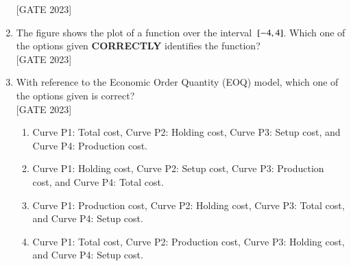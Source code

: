 \documentclass[journal,12pt,onecolumn]{IEEEtran}
\theoremstyle{remark}
\begin{document}
\begin{enumerate}
\hfill{[GATE 2023]}\begin{enumerate}
\end{enumerate}

\item The figure shows the plot of a function over the interval ${}\left[-4, 4\right]$. Which one of the options given \textbf{CORRECTLY} identifies the function?\\



\hfill{[GATE 2023]}\begin{enumerate}
\end{enumerate}
\item With reference to the Economic Order Quantity (EOQ) model, which one of the options given is correct?\\ 




\hfill{[GATE 2023]}\begin{enumerate}
   \item Curve P1: Total cost, Curve P2: Holding cost, Curve P3: Setup cost, and Curve P4: Production cost.
   \item Curve P1: Holding cost, Curve P2: Setup cost, Curve P3: Production cost, and Curve P4: Total cost.
   \item Curve P1: Production cost, Curve P2: Holding cost, Curve P3: Total cost, and Curve P4: Setup cost.
   \item Curve P1: Total cost, Curve P2: Production cost, Curve P3: Holding cost, and Curve P4: Setup cost.
\end{enumerate}

\end{enumerate}
\end{document}
